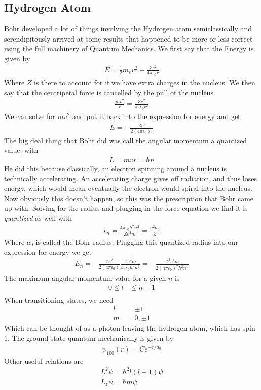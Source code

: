 \subsection{Hydrogen Atom}
Bohr developed a lot of things involving the Hydrogen atom semiclassically and serendipitously arrived at some results that happened to be more or less correct using the full machinery  of Quantum Mechanics. We first say that the Energy is given by
\begin{align}
E = \frac{1}{2}m_ev^2 - \frac{Ze^2}{4\pi\epsilon_0 r}
\end{align}
Where $Z$ is there to account for if we have extra charges in the nucleus. We then say that the centripetal force is cancelled by the pull of the nucleus
\begin{align}
\frac{mv^2}{r} = \frac{Ze^2}{4\pi\epsilon_0 r^2}
\end{align}
We can solve for $mv^2$ and put it back into the expression for energy and get
\begin{align}
E = -\frac{Ze^2}{2(4\pi\epsilon_0) r}
\end{align}
The big deal thing that Bohr did was call the angular momentum a quantized value, with
\begin{align}
L = mvr = \hbar n
\end{align}
He did this because classically, an electron spinning around a nucleus is technically accelerating. An accelerating charge gives off radiation, and thus loses energy, which would mean eventually the electron would spiral into the nucleus. Now obviously this doesn't happen, so this was the prescription that Bohr came up with. Solving for the radius and plugging in the force equation we find it is \emph{quantized} as well with
\begin{align}
r_n = \frac{4\pi\epsilon_0 \hbar^2n^2}{Ze^2m} = \frac{n^2a_0}{Z}
\end{align}
Where $a_0$ is called the Bohr radius. Plugging this quantized radius into our expression for energy we get
\begin{align}
E_n = -\frac{Ze^2}{2(4\pi\epsilon_0)}\frac{Ze^2m}{4\pi\epsilon_0\hbar^2n^2} = -\frac{Z^2e^4m}{2(4\pi\epsilon_0)^2\hbar^2n^2}
\end{align}
The maximum angular momentum value for a given $n$ is
\begin{align}
    0 \le l &\le n-1\\
\end{align}
When transitioning states, we need
\begin{align}
    l &= \pm 1\\
    m &= 0, \pm 1
\end{align}
Which can be thought of as a photon leaving the hydrogen atom, which has spin $1$. The ground state quantum mechanically is given by
\begin{align}
\psi_{100}(r) = Ce^{-r/a_0}
\end{align}
Other useful relations are
\begin{align}
L^2\psi = \hbar^2l(l+1)\psi\\
L_z\psi = \hbar m\psi
\end{align}


